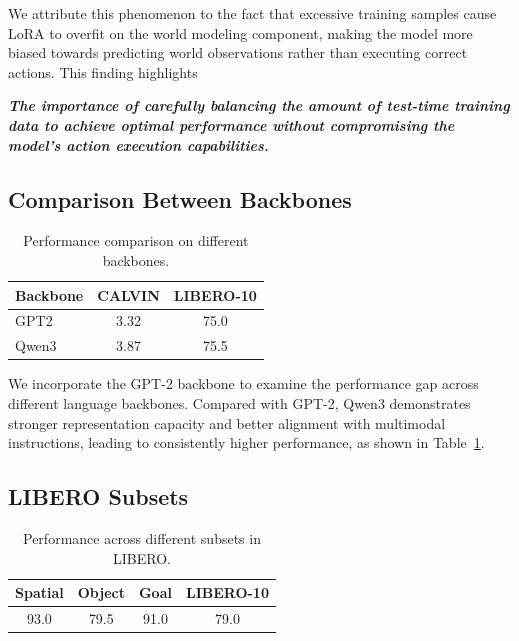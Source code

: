 We attribute this phenomenon to the fact that excessive training samples cause LoRA to overfit on the world modeling component, making the model more biased towards predicting world observations rather than executing correct actions. This finding highlights

\textbf{\textit{The importance of carefully balancing the amount of test-time training data to achieve optimal performance without compromising the model's action execution capabilities.}}



\subsection{Comparison Between Backbones}

\begin{table}[h]
\centering
\begin{tabular}{lcc}
\toprule
Backbone & CALVIN & LIBERO-10 \\
\midrule
GPT2   & 3.32 & 75.0 \\
Qwen3  & 3.87 & 75.5 \\
\bottomrule
\end{tabular} 
\caption{Performance comparison on different backbones.}
\label{tab:backbone_comparison}
\end{table}

We incorporate the GPT-2 \cite{radford2019language} backbone to examine the performance gap across different language backbones. Compared with GPT-2, Qwen3 demonstrates stronger representation capacity and better alignment with multimodal instructions, leading to consistently higher performance, as shown in Table~\ref{tab:backbone_comparison}.


\subsection{LIBERO Subsets}

\begin{table}[h]
\centering

\begin{tabular}{cccc}
\toprule
Spatial & Object & Goal & LIBERO-10 \\
\midrule
93.0 & 79.5 & 91.0  & 79.0 \\
\bottomrule
\end{tabular} 
\caption{Performance across different subsets in LIBERO.}
\label{tab:libero_subsets}
\end{table}

